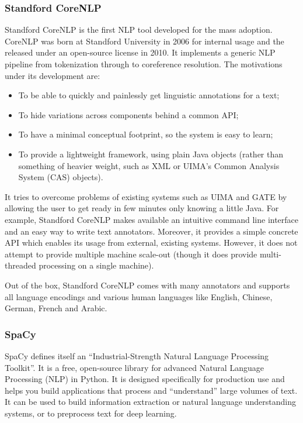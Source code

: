 \subsubsection{Standford CoreNLP}

Standford CoreNLP \cite{manning2014stanford} is the first NLP tool
developed for the mass adoption. CoreNLP was born at Standford
University in 2006 for internal usage and the released under an
open-source license in 2010. It implements a generic NLP pipeline from
tokenization through to coreference resolution. The motivations under
its development are:
\begin{itemize}
  \item To be able to quickly and painlessly get linguistic
  annotations for a text;
  \item To hide variations across components behind a common API;
  \item To have a minimal conceptual footprint, so the system is easy
  to learn;
  \item To provide a lightweight framework, using plain Java objects
  (rather than something of heavier weight, such as XML or UIMA's
  Common Analysis System (CAS) objects).
\end{itemize}
It tries to overcome problems of existing systems such as UIMA
\cite{ferrucci2004uima} and GATE \cite{cunningham2002gate} by allowing
the user to get ready in few minutes only knowing a little Java. For
example, Standford CoreNLP makes available an intuitive command line
interface and an easy way to write text annotators. Moreover, it
provides a simple concrete API which enables its usage from external,
existing systems. However, it does not attempt to provide multiple
machine scale-out (though it does provide multi-threaded processing on
a single machine).

Out of the box, Standford CoreNLP comes with many annotators and
supports all language encodings and various human languages like
English, Chinese, German, French and Arabic.

\subsubsection{SpaCy}

SpaCy \cite{honnibal2020spacy} defines itself an ``Industrial-Strength
Natural Language Processing Toolkit''. It is a free, open-source
library for advanced Natural Language Processing (NLP) in Python. It
is designed specifically for production use and helps you build
applications that process and ``understand'' large volumes of text. It
can be used to build information extraction or natural language
understanding systems, or to preprocess text for deep learning.

